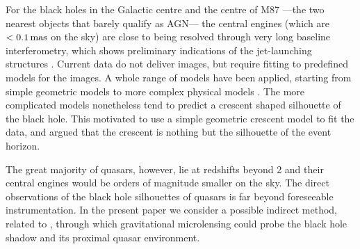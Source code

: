 \documentclass[usenatbib]{mn2e}
\begin{document}
For the black holes in the Galactic centre and the centre of M87
---the two nearest objects that barely qualify as AGN--- the central
engines (which are $<0.1\rm\,mas$ on the sky) are close to being
resolved through very long baseline interferometry, which shows
preliminary indications of the jet-launching structures
\citep{2008JPhCS.131a2055D,2012Sci...338..355D,2013MNRAS.434..765K,2016arXiv160205527F}.
Current data do not deliver images, but require fitting to
predefined models for the images.  A whole range of models have been
applied, starting from simple geometric models to more complex
physical models
\citep{2008Natur.455...78D,2011ApJ...738...38B,2009ApJ...706..497M,2010ApJ...717.1092D}.
The more complicated models nonetheless tend to predict a crescent
shaped silhouette of the black hole.  This motivated
\cite{2013MNRAS.434..765K} to use a simple geometric crescent model to
fit the data, and argued that the crescent is nothing but the
silhouette of the event horizon.

The great majority of quasars, however, lie at redshifts beyond 2
\citep{2014A&A...563A..54P} and their central engines would be orders
of magnitude smaller on the sky. The direct observations of the black
hole silhouettes of quasars is far beyond foreseeable instrumentation.
In the present paper we consider a possible indirect method, related
to \cite{1999ApJ...524...49A}, through which gravitational
microlensing could probe the black hole shadow and its proximal quasar
environment.
\end{document}
